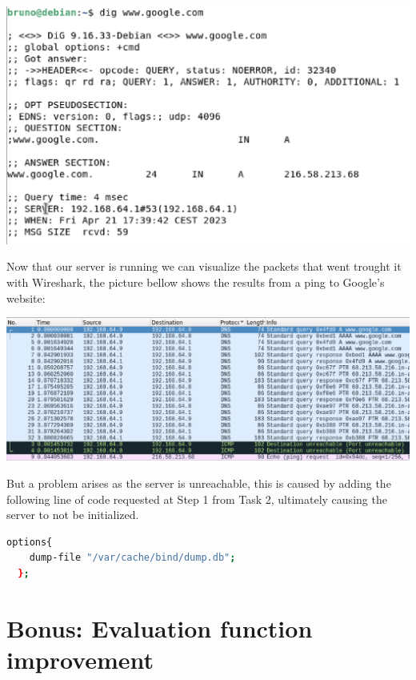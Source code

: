 \documentclass{article}
\begin{document}
\hbox{}

\includegraphics[scale=0.5]{images/dig-google.png}

\hbox{}

Now that our server is running we can visualize the packets that went trought it with Wireshark, the picture bellow shows the results from a ping to Google's website:

\hbox{}

\includegraphics[scale=0.5]{images/ping-google.png}

\hbox{}

But a problem arises as the server is unreachable, this is caused by adding the following line of code requested at Step 1 from Task 2, ultimately causing the server to not be initialized.

\hbox{}

\begin{lstlisting}[language=bash, frame=tlbr, framesep=6pt, backgroundcolor=\color{light-gray}]
  options{
    dump-file "/var/cache/bind/dump.db";
  };
\end{lstlisting}



\hbox{}

\pagebreak
\section{Bonus: Evaluation function improvement}
\end{document}
